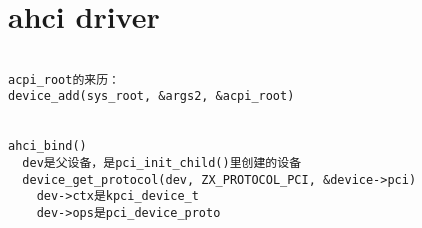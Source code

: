 \section{ahci driver}

\begin{verbatim}

acpi_root的来历：
device_add(sys_root, &args2, &acpi_root)


ahci_bind()
  dev是父设备，是pci_init_child()里创建的设备
  device_get_protocol(dev, ZX_PROTOCOL_PCI, &device->pci)
    dev->ctx是kpci_device_t
    dev->ops是pci_device_proto
  
\end{verbatim}